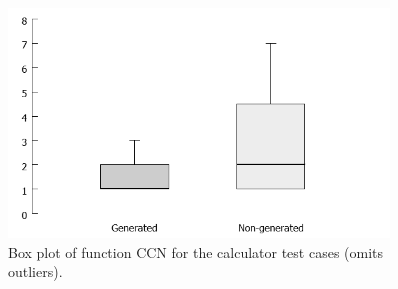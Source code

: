 \begin{figure}[h!]
\centering
\includegraphics[width=0.9\textwidth]{figures/Lizard_Calculator_CCN.png}
\caption[Box plot of function CCN for the calculator test cases.]{Box plot of function CCN for the calculator test cases (omits outliers).}
\label{fig:Lizard_Calculator_CCN}
\end{figure}






